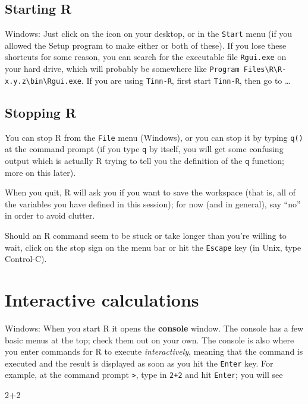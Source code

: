 \documentclass[11pt,]{article}
\newenvironment{Shaded}{\begin{snugshade}}{\end{snugshade}}
\newcommand{\DecValTok}[1]{\textcolor[rgb]{0.00,0.00,0.81}{#1}}
\newcommand{\OperatorTok}[1]{\textcolor[rgb]{0.81,0.36,0.00}{\textbf{#1}}}
\begin{document}
\subsection{Starting R}\label{starting-r}

Windows: Just click on the icon on your desktop, or in the
\texttt{Start} menu (if you allowed the Setup program to make either or
both of these). If you lose these shortcuts for some reason, you can
search for the executable file \texttt{Rgui.exe} on your hard drive,
which will probably be somewhere like
\texttt{Program\ Files\textbackslash{}R\textbackslash{}R-x.y.z\textbackslash{}bin\textbackslash{}Rgui.exe}.
If you are using \texttt{Tinn-R}, first start \texttt{Tinn-R}, then go
to \ldots{}

\subsection{Stopping R}\label{stopping-r}

You can stop R from the \texttt{File} menu (Windows), or you can stop it
by typing \texttt{q()} at the command prompt (if you type \texttt{q} by
itself, you will get some confusing output which is actually R trying to
tell you the definition of the \texttt{q} function; more on this later).

When you quit, R will ask you if you want to save the workspace (that
is, all of the variables you have defined in this session); for now (and
in general), say ``no'' in order to avoid clutter.

Should an R command seem to be stuck or take longer than you're willing
to wait, click on the stop sign on the menu bar or hit the
\texttt{Escape} key (in Unix, type Control-C).

\section{Interactive calculations}\label{interactive-calculations}

Windows: When you start R it opens the \textbf{console} window. The
console has a few basic menus at the top; check them out on your own.
The console is also where you enter commands for R to execute
\emph{interactively}, meaning that the command is executed and the
result is displayed as soon as you hit the \texttt{Enter} key. For
example, at the command prompt \texttt{\textgreater{}}, type in
\texttt{2+2} and hit \texttt{Enter}; you will see

\begin{Shaded}
\begin{Highlighting}[]
\DecValTok{2}\OperatorTok{+}\DecValTok{2} 
\end{Highlighting}
\end{Shaded}
\end{document}
